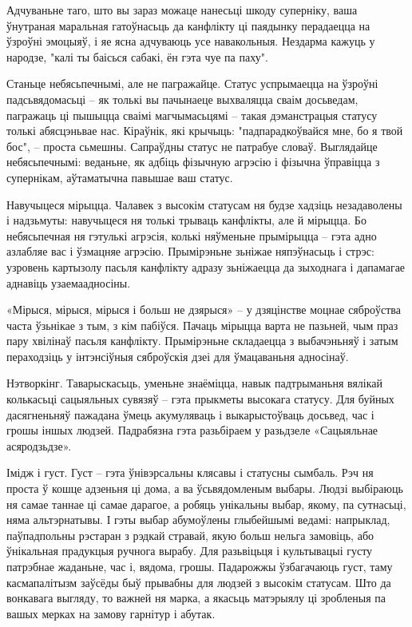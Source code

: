 Адчуваньне таго, што вы зараз можаце нанесьці шкоду суперніку, ваша ўнутраная маральная гатоўнасьць да канфлікту ці паядынку перадаецца на ўзроўні эмоцыяў, і яе ясна адчуваюць усе навакольныя. Нездарма кажуць у народзе, "калі ты баісься сабакі, ён гэта чуе па паху".

Станьце небясьпечнымі, але не пагражайце. Статус успрымаецца на ўзроўні падсьвядомасьці – як толькі вы пачынаеце выхваляцца сваім досьведам, пагражаць ці пышыцца сваімі магчымасьцямі – такая дэманстрацыя статусу толькі абясцэньвае нас. Кіраўнік, які крычыць: "падпарадкоўвайся мне, бо я твой бос", – проста сьмешны. Сапраўдны статус не патрабуе словаў. Выглядайце небясьпечнымі: веданьне, як адбіць фізычную агрэсію і фізычна ўправіцца з супернікам, аўтаматычна павышае ваш статус.

Навучыцеся мірыцца. Чалавек з высокім статусам ня будзе хадзіць незадаволены і надзьмуты: навучыцеся ня толькі трываць канфлікты, але й мірыцца. Бо небясьпечная ня гэтулькі агрэсія, колькі няўменьне прымірыцца – гэта адно азлабляе вас і ўзмацняе агрэсію. Прымірэньне зьніжае няпэўнасьць і стрэс: узровень картызолу пасьля канфлікту адразу зьніжаецца да зыходнага і дапамагае аднавіць узаемаадносіны.

«Мірыся, мірыся, мірыся і больш не дзярыся» – у дзяцінстве моцнае сяброўства часта ўзьнікае з тым, з кім пабіўся. Пачаць мірыцца варта не пазьней, чым праз пару хвілінаў пасьля канфлікту. Прымірэньне складаецца з выбачэньняў і затым пераходзіць у інтэнсіўныя сяброўскія дзеі для ўмацаваньня адносінаў.

Нэтворкінг. Таварыскасьць, уменьне знаёміцца, навык падтрыманьня вялікай колькасьці сацыяльных сувязяў – гэта прыкметы высокага статусу. Для буйных дасягненьняў пажадана ўмець акумуляваць і выкарыстоўваць досьвед, час і грошы іншых людзей. Падрабязна гэта разьбіраем у разьдзеле «Сацыяльнае асяродзьдзе».

Імідж і густ. Густ – гэта ўнівэрсальны клясавы і статусны сымбаль. Рэч ня проста ў кошце адзеньня ці дома, а ва ўсьвядомленым выбары. Людзі выбіраюць ня самае таннае ці самае дарагое, а робяць унікальны выбар, якому, па сутнасьці, няма альтэрнатывы. І гэты выбар абумоўлены глыбейшымі ведамі: напрыклад, паўпадпольны рэстаран з рэдкай стравай, якую больш нельга замовіць, або ўнікальная прадукцыя ручнога вырабу. Для разьвіцьця і культывацыі густу патрэбнае жаданьне, час і, вядома, грошы. Падарожжы ўзбагачаюць густ, таму касмапалітызм заўсёды быў прывабны для людзей з высокім статусам. Што да вонкавага выгляду, то важней ня марка, а якасьць матэрыялу ці зробленыя па вашых мерках на замову гарнітур і абутак.

